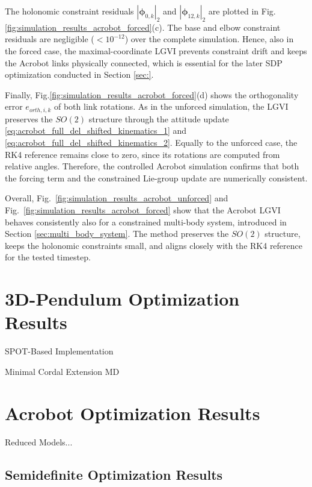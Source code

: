 The holonomic constraint residuals $|\bm{\phi}_{0,k}|_2$ and $|\bm{\phi}_{12,k}|_2$ are plotted in Fig.\ref{fig:simulation_results_acrobot_forced}(c). The base and elbow constraint residuals are negligible ($< 10^{-12}$) over the complete simulation. Hence, also in the forced case, the maximal-coordinate LGVI prevents constraint drift and keeps the Acrobot links physically connected, which is essential for the later SDP optimization conducted in Section \ref{sec:}.

Finally, Fig.\ref{fig:simulation_results_acrobot_forced}(d) shows the orthogonality error $e_{orth,i,k}$ of both link rotations. As in the unforced simulation, the LGVI preserves the $SO(2)$ structure through the attitude update \eqref{eq:acrobot_full_del_shifted_kinematics_1} and \eqref{eq:acrobot_full_del_shifted_kinematics_2}. Equally to the unforced case, the RK4 reference remains close to zero, since its rotations are computed from relative angles. Therefore, the controlled Acrobot simulation confirms that both the forcing term and the constrained Lie-group update are numerically consistent.

Overall, Fig.~\ref{fig:simulation_results_acrobot_unforced} and
Fig.~\ref{fig:simulation_results_acrobot_forced} show that the Acrobot LGVI behaves
consistently also for a constrained multi-body system, introduced in Section \ref{sec:multi_body_system}. The method preserves the
\(SO(2)\) structure, keeps the holonomic constraints small, and aligns closely with
the RK4 reference for the tested timestep.


\section{3D-Pendulum Optimization Results}
\label{sec:optimization_results}

SPOT-Based Implementation

Minimal Cordal Extension MD

\section{Acrobot Optimization Results}
\label{sec:acrobot_optimization_results}
Reduced Models...

\subsection{Semidefinite Optimization Results}
\label{subsec:acrobot_optimization_results}


